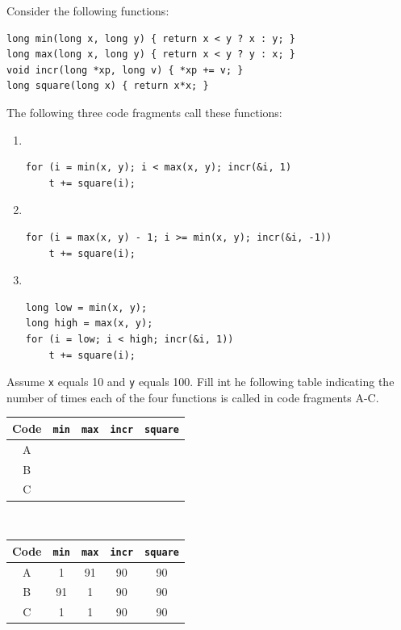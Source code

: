 \documentclass[12pt]{article}
\newenvironment{ex}[2][Exercise]{\begin{trivlist}
		\item[\hskip \labelsep {\bfseries #1}\hskip \labelsep {\bfseries #2.}]}{\end{trivlist}}
\newenvironment{sol}[1][Solution]{\begin{trivlist}
		\item[\hskip \labelsep {\bfseries #1:}]}{\end{trivlist}}
\begin{document}
\begin{ex}{5.3}
	Consider the following functions:
	\begin{lstlisting}
long min(long x, long y) { return x < y ? x : y; }
long max(long x, long y) { return x < y ? y : x; }
void incr(long *xp, long v) { *xp += v; }
long square(long x) { return x*x; }
	\end{lstlisting}
	The following three code fragments call these functions:
	\begin{enumerate}[label=(\alph*)]
		\item \
		\begin{lstlisting}
for (i = min(x, y); i < max(x, y); incr(&i, 1)
	t += square(i);
		\end{lstlisting}
		\item \
		\begin{lstlisting}
for (i = max(x, y) - 1; i >= min(x, y); incr(&i, -1))
	t += square(i);
		\end{lstlisting}
		\item \
		\begin{lstlisting}
long low = min(x, y);
long high = max(x, y);
for (i = low; i < high; incr(&i, 1))
	t += square(i);
		\end{lstlisting}
	\end{enumerate}
	Assume \texttt{x} equals 10 and \texttt{y} equals 100. Fill int he following
	table indicating the number of times each of the four functions is called
	in code fragments A-C.
	\begin{center}
		\begin{tabular}{ccccc}
			Code & \texttt{min} & \texttt{max} & \texttt{incr} & \texttt{square}\\
			\hline
			A & \makebox[1cm]{\hrulefill} & \makebox[1cm]{\hrulefill} & \makebox[1cm]{\hrulefill} & \makebox[1cm]{\hrulefill}\\
			
			B & \makebox[1cm]{\hrulefill} & \makebox[1cm]{\hrulefill} & \makebox[1cm]{\hrulefill} & \makebox[1cm]{\hrulefill}\\
			
			C & \makebox[1cm]{\hrulefill} & \makebox[1cm]{\hrulefill} & \makebox[1cm]{\hrulefill} & \makebox[1cm]{\hrulefill}\\
		\end{tabular}
	\end{center}
\end{ex}

\begin{sol}
	\
	\begin{center}
		\begin{tabular}{ccccc}
			Code & \texttt{min} & \texttt{max} & \texttt{incr} & \texttt{square}\\
			\hline
			A & 1 & 91 & 90 & 90\\
			
			B & 91 & 1 & 90 & 90\\
			
			C & 1 & 1 & 90 & 90\\
		\end{tabular}
	\end{center}
\end{sol}
\end{document}
